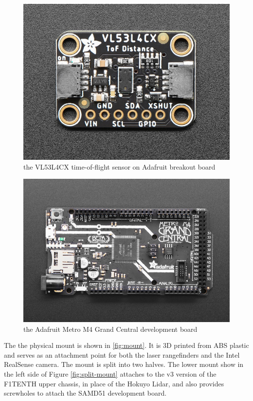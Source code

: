 \documentclass[conference]{IEEEtran}
\begin{document}
\begin{figure}
\centering
\includegraphics[scale=0.31]{vl53l4cx-adafruit.png}
\caption{the VL53L4CX time-of-flight sensor on Adafruit breakout board}
\label{fig:vl53l4cx}
\end{figure}

\begin{figure}
\centering
\includegraphics[scale=0.31]{grand-central.png}
\caption{the Adafruit Metro M4 Grand Central development board}
\label{fig:grand-central}
\end{figure}

The the physical mount is shown in \ref{fig:mount}. It is 3D printed from ABS
plastic and serves as an attachment point for both the laser rangefinders and
the Intel RealSense camera. The mount is split into two halves. The lower mount
show in the left side of Figure \ref{fig:split-mount} attaches to the v3
version of the F1TENTH upper chassis, in place of the Hokuyo Lidar, and also
provides screwholes to attach the SAMD51 development board.
\end{document}
